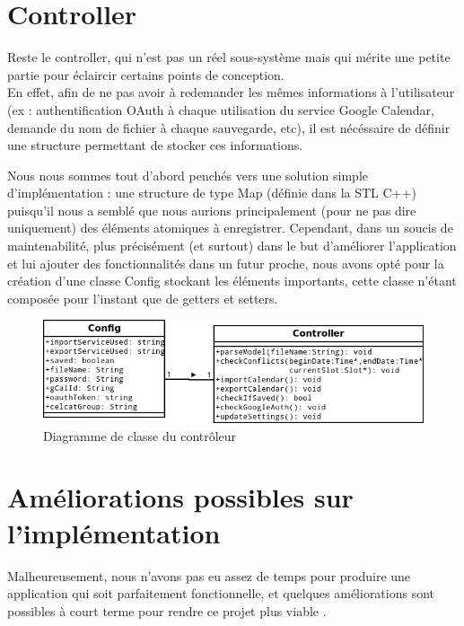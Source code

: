\chapter{Controller}
	Reste le controller, qui n'est pas un réel sous-système mais qui mérite une petite partie pour éclaircir certains points de conception.\\
	
	En effet, afin de ne pas avoir à redemander les mêmes informations à l'utilisateur (ex : authentification OAuth à chaque utilisation du service Google Calendar, demande du nom de fichier à chaque sauvegarde, etc), il est nécéssaire de définir une structure permettant de stocker ces informations.
	
	Nous nous sommes tout d'abord penchés vers une solution simple d'implémentation : une structure de type Map (définie dans la STL C++) puisqu'il nous a semblé que nous aurions principalement (pour ne pas dire uniquement) des éléments atomiques à enregistrer. Cependant, dans un soucis de maintenabilité, plus précisément (et surtout) dans le but d'améliorer l'application et lui ajouter des fonctionnalités dans un futur proche, nous avons opté pour la création d'une classe Config stockant les éléments importants, cette classe n'étant composée pour l'instant que de getters et setters.
	\begin{figure}[!h]
		\centering
		\includegraphics[scale=0.65]{diagclasses_controller.png}
		\caption{Diagramme de classe du contrôleur}
	\end{figure}
	\FloatBarrier
	
	
\chapter{Améliorations possibles sur l'implémentation}
	Malheureusement, nous n'avons pas eu assez de temps pour produire une application qui soit parfaitement fonctionnelle, et quelques améliorations sont possibles à court terme pour rendre ce projet plus \og viable \fg.
	

